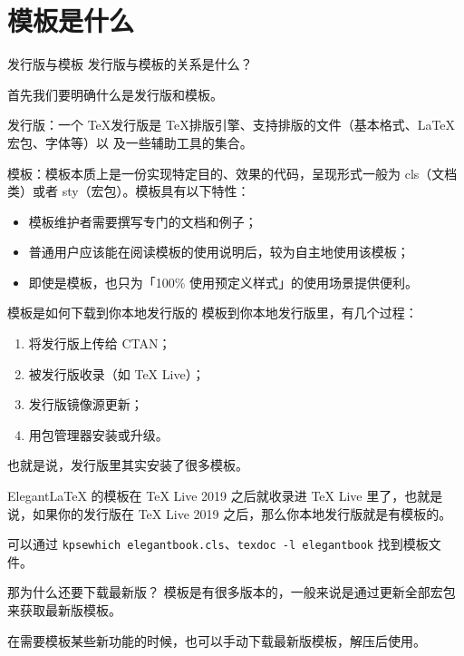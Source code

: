 
\section{模板是什么}
\begin{frame}{发行版与模板}
  发行版与模板的关系是什么？\pause

  首先我们要明确什么是发行版和模板。\pause

  发行版：一个 \TeX 发行版是 \TeX 排版引擎、支持排版的文件（基本格式、\LaTeX 宏包、字体等）以
  及一些辅助工具的集合。\pause

  模板：模板本质上是一份实现特定目的、效果的代码，呈现形式一般为 cls（文档类）或者 sty（宏包）。模板具有以下特性：
  \begin{itemize}
    \item 模板维护者需要撰写专门的文档和例子；
    \item 普通用户应该能在阅读模板的使用说明后，较为自主地使用该模板；
    \item 即使是模板，也只为「100\% 使用预定义样式」的使用场景提供便利。
  \end{itemize}
\end{frame}

\begin{frame}[fragile]{模板是如何下载到你本地发行版的}
  模板到你本地发行版里，有几个过程：
  \begin{enumerate}
    \item 将发行版上传给 CTAN；
    \item 被发行版收录（如 TeX Live）；
    \item 发行版镜像源更新；
    \item 用包管理器安装或升级。
  \end{enumerate}

  也就是说，发行版里其实安装了很多模板。
  
  ElegantLaTeX 的模板在 TeX Live 2019 之后就收录进 TeX Live 里了，也就是说，如果你的发行版在 TeX Live 2019 之后，那么你本地发行版就是有模板的。

  可以通过 \lstinline{kpsewhich elegantbook.cls}、\lstinline{texdoc -l elegantbook} 找到模板文件。
\end{frame}

\begin{frame}{那为什么还要下载最新版？}
  模板是有很多版本的，一般来说是通过更新全部宏包来获取最新版模板。

  在需要模板某些新功能的时候，也可以手动下载最新版模板，解压后使用。
\end{frame}

